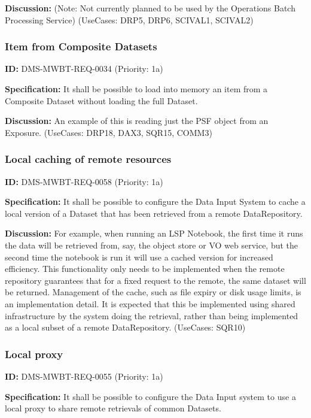 \documentclass[SE,toc,lsstdraft]{lsstdoc}
\begin{document}
\textbf{Discussion:}
(Note: Not currently planned to be used by the Operations Batch Processing Service) (UseCases: DRP5, DRP6, SCIVAL1, SCIVAL2)

\subsubsection{Item from Composite Datasets}

\label{DMS-MWBT-REQ-0034}
\textbf{ID:} DMS-MWBT-REQ-0034 (Priority: 1a)

\textbf{Specification:}
It shall be possible to load into memory an item from a Composite Dataset without loading the full Dataset.

\textbf{Discussion:}
An example of this is reading just the PSF object from an Exposure. (UseCases: DRP18, DAX3, SQR15, COMM3)

\subsubsection{Local caching of remote resources}

\label{DMS-MWBT-REQ-0058}
\textbf{ID:} DMS-MWBT-REQ-0058 (Priority: 1a)

\textbf{Specification:}
It shall be possible to configure the Data Input System to cache a local version of a Dataset that has been retrieved from a remote DataRepository.

\textbf{Discussion:}
For example, when running an LSP Notebook, the first time it runs the data will be retrieved from, say, the object store or VO web service, but the second time the notebook is run it will use a cached version for increased efficiency. This functionality only needs to be implemented when the remote repository guarantees that for a fixed request to the remote, the same dataset will be returned. Management of the cache, such as file expiry or disk usage limits, is an implementation detail. It is expected that this be implemented using shared infrastructure by the system doing the retrieval, rather than being implemented as a local subset of a remote DataRepository. (UseCases: SQR10)

\subsubsection{Local proxy}

\label{DMS-MWBT-REQ-0055}
\textbf{ID:} DMS-MWBT-REQ-0055 (Priority: 1a)

\textbf{Specification:}
It shall be possible to configure the Data Input system to use a local proxy to share remote retrievals of common Datasets.
\end{document}
